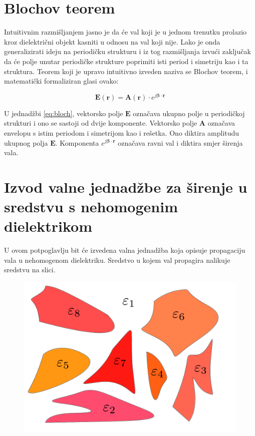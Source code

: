 \documentclass[utf8, seminar]{fer}
\begin{document}
\section{Blochov teorem}

Intuitivnim razmišljanjem jasno je da će val koji je u jednom trenutku prolazio
kroz dielektrični objekt kasniti u odnosu na val koji nije. Lako je onda
generalizirati ideju na periodičku strukturu i iz tog razmišljanja izvući
zaključak da će polje unutar periodičke strukture poprimiti isti period i
simetriju kao i ta struktura. Teorem koji je upravo intuitivno izveden naziva se
Blochov teorem, i matematički formaliziran glasi ovako:

\begin{equation} \label{eq:bloch}
	\mathbf{E}(\mathbf{r}) =
	\mathbf{A}(\mathbf{r}) \cdot e^{j \mathbf{\beta} \cdot \mathbf{r}}
\end{equation}

U jednadžbi \ref{eq:bloch}, vektorsko polje $\mathbf{E}$ označava ukupno polje
u periodičkoj strukturi i ono se sastoji od dvije komponente. Vektorsko polje
$\mathbf{A}$ označava envelopu s istim periodom i simetrijom kao i rešetka.
Ono diktira amplitudu ukupnog polja $\mathbf{E}$.
Komponenta ${e^{j \mathbf{\beta} \cdot \mathbf{r}}}$ označava ravni val i diktira
smjer širenja vala.




\section{Izvod valne jednadžbe za širenje u sredstvu s nehomogenim dielektrikom}

U ovom potpoglavlju bit će izvedena valna jednadžba koja opisuje propagaciju
vala u nehomogenom dielektriku. Sredstvo u kojem val propagira nalikuje sredstvu
na slici.

\begin{figure}
	\centering
	\includegraphics[scale=0.5]{./images/structure-model.pdf}
\end{figure}
\end{document}
